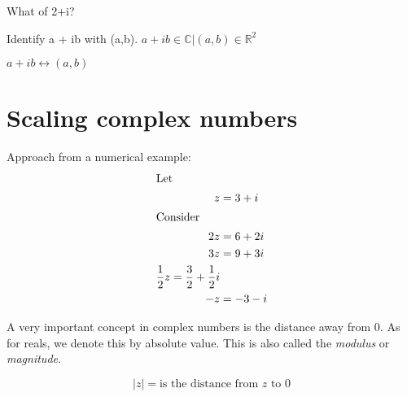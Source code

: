 %

What of 2+i?

Identify a + ib with (a,b).
$a + ib \in \mathbb{C} | (a,b) \in \mathbb{R}^2$

$a + ib \leftrightarrow (a,b)$

\section{Scaling complex numbers}
Approach from a numerical example:
\begin{align}
  \intertext{Let}
    z &= 3 + i \\
  \intertext{Consider}
    2z &= 6 + 2i \\
    3z &= 9 + 3i \\
    \frac{1}{2}z = \frac{3}{2} + \frac{1}{2}i \\
    -z &= -3 -i \\
\end{align}

A very important concept in complex numbers is the distance away from $0$. As
for reals, we denote this by absolute value. This is also called the \emph{modulus}
or \emph{magnitude}.

$$|z| = \text{is the distance from $z$ to $0$}$$
